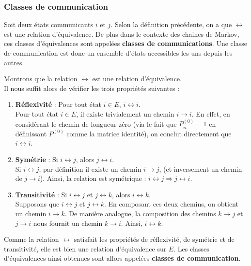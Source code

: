 \documentclass{article}
\begin{document}
\subsubsection{Classes de communication}

\begin{tcolorbox}[colback=white,colframe=red!80!black,title=Classe de communication]
Soit deux états communicants $i$ et $j$. Selon la définition précédente, on a que $\leftrightarrow$ est une relation d'équivalence. De plus dans le contexte des chaines de Markov, ces classes d'équivalences sont appelées \textbf{classes de communications}.
Une classe de communication est donc un ensemble d'états accessibles les uns depuis les autres.
\end{tcolorbox}

\begin{tcolorbox}[colback=white,colframe=green!80!black,title=Démonstration, breakable]
Montrons que la relation $\leftrightarrow$ est une relation d'équivalence. \\

Il nous suffit alors de vérifier les trois propriétés suivantes :
\begin{enumerate}
    \item \textbf{Réflexivité} : Pour tout état $i \in E$, $i \leftrightarrow i$. \\
        Pour tout état $i \in E$, il existe trivialement un chemin $i \to i$. En effet, en considérant le chemin de longueur zéro (via le fait que $P_{ii}^{(0)} = 1$ en définissant $P^{(0)}$ comme la matrice identité), on conclut directement que $i \leftrightarrow i$.
\newpage %
    \item \textbf{Symétrie} : Si $i \leftrightarrow j$, alors $j \leftrightarrow i$. \\
        Si $i \leftrightarrow j$, par définition il existe un chemin $i \to j$, (et inversement un chemin de $j \to i$). Ainsi, la relation est symétrique : $i \leftrightarrow j \Rightarrow j \leftrightarrow i$.
    \item \textbf{Transitivité} : Si $i \leftrightarrow j$ et $j \leftrightarrow k$, alors $i \leftrightarrow k$. \\
    Supposons que $i \leftrightarrow j$ et $j \leftrightarrow k$. En composant ces deux chemins, on obtient un chemin $i \to k$. De manière analogue, la composition des chemins $k \to j$ et $j \to i$ nous fournit un chemin $k \to i$. Ainsi, $i \leftrightarrow k$. \\
\end{enumerate}

Comme la relation $\leftrightarrow$ satisfait les propriétés de réflexivité, de symétrie et de transitivité, elle est bien une relation d'équivalence sur $E$. Les classes d'équivalences ainsi obtenues sont allors appelées \textbf{classes de communication}.
\end{tcolorbox}
\end{document}
